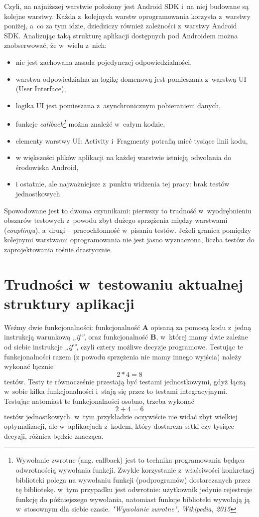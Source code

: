 Czyli, na najniższej warstwie położony jest Android SDK i~na niej budowane są kolejne warstwy. Każda z~kolejnych warstw oprogramowania korzysta z~warstwy poniżej, a~co za tym idzie, dziedziczy również zależności z~warstwy Android SDK. Analizując taką strukturę aplikacji dostępnych pod Androidem można zaobserwować, że w~wielu z~nich:
\begin{itemize}
\item
nie jest zachowana zasada pojedynczej odpowiedzialności,
\item
warstwa odpowiedzialna za logikę domenową jest pomieszana z~warstwą UI (User Interface),
\item
logika UI jest pomieszana z~asynchronicznym pobieraniem danych,
\item
funkcje \textit{callback\footnote{Wywołanie zwrotne (ang. callback) jest to technika programowania będąca odwrotnością wywołania funkcji. Zwykle korzystanie z~właściwości konkretnej biblioteki polega na wywołaniu funkcji (podprogramów) dostarczanych przez tę bibliotekę. w~tym przypadku jest odwrotnie: użytkownik jedynie rejestruje funkcję do późniejszego wywołania, natomiast funkcje biblioteki wywołają ją w~stosownym dla siebie czasie. \textit{"Wywołanie zwrotne", Wikipedia, 2015}}} można znaleźć w~całym kodzie,
\item
elementy warstwy UI: Activity i~Fragmenty potrafią mieć tysiące linii kodu,
\item
w większości plików aplikacji na każdej warstwie istnieją odwołania do środowiska Android,
\item
i ostatnie, ale najważniejsze z~punktu widzenia tej pracy: brak testów jednostkowych.
\end{itemize}

Spowodowane jest to dwoma czynnikami: pierwszy to trudność w~wyodrębnieniu obszarów testowych z~powodu zbyt dużego sprzężenia między warstwami (\textit{couplingu}), a~drugi – pracochłonność w~pisaniu testów. Jeżeli granica pomiędzy kolejnymi warstwami oprogramowania nie jest jasno wyznaczona, liczba testów do zaprojektowania rośnie drastycznie.

\section{Trudności w~testowaniu aktualnej struktury \newline aplikacji}
\label{testowanie_starej_struktury}

Weźmy dwie funkcjonalności: funkcjonalność \textbf{A} opisaną za pomocą kodu z~jedną instrukcją warunkową \textit{„if”}, oraz funkcjonalność \textbf{B}, w~której mamy dwie zależne od siebie instrukcje \textit{„if”}, czyli cztery możliwe decyzje programowe. Testując te funkcjonalności razem (z powodu sprzężenia nie mamy innego wyjścia) należy wykonać łącznie 
\[2*4=8\]
testów. Testy te równocześnie przestają być testami jednostkowymi, gdyż łączą w~sobie kilka funkcjonalności i~stają się przez to testami integracyjnymi. Testując natomiast te funkcjonalności osobno, trzeba wykonać 
\[2+4=6\]
testów jednostkowych. w~tym przykładzie oczywiście nie widać zbyt wielkiej optymalizacji, ale w~aplikacjach z~kodem, który dostarcza setki czy tysiące decyzji, różnica będzie znacząca.

